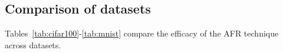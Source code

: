 \subsection{Comparison of datasets}
Tables~\ref{tab:cifar100}-\ref{tab:mnist} compare the efficacy of the AFR technique across datasets.





